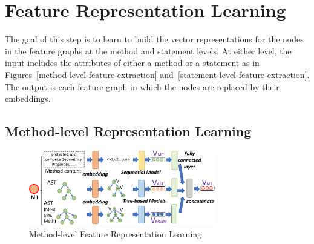 \section{Feature Representation Learning}
\label{feature-learning:sec}

The goal of this step is to learn to build the vector representations
for the nodes in the feature graphs at the method and statement levels.
At either level, the input includes the attributes of either a method
or a statement as in Figures~\ref{method-level-feature-extraction}
and~\ref{statement-level-feature-extraction}. The output is each
feature graph in which the nodes are replaced by their embeddings.



\subsection{Method-level Representation Learning}

\begin{figure}[t]
	\centering
	\includegraphics[width=3.2in]{graphs/step-2-method-new-2.png}
        \vspace{-8pt}
	\caption{Method-level Feature Representation Learning}
	\label{method-level-feature-learning}
\end{figure}




